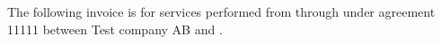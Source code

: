 \documentclass{invoice}
\def\leftOne{Test company AB}
\begin{document}
 \sffamily%
 \makecompany
 The following invoice is for services performed from \startDate{} through
\endDate{} under agreement 11111 between \leftOne{} and \companyName.
 
 \makeproducts
\end{document}
